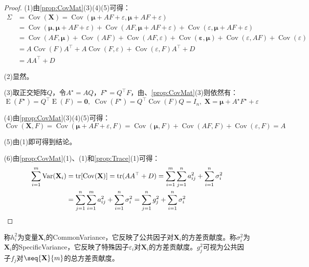 \begin{proof}
	(1)由\cref{prop:CovMat}(3)(4)(5)可得：
	\begin{align*}
		\Sigma&=\operatorname{Cov}(\mathbf{X})=\operatorname{Cov}(\boldsymbol{\mu}+AF+\varepsilon,\boldsymbol{\mu}+AF+\varepsilon) \\
		&=\operatorname{Cov}(\boldsymbol{\mu},\boldsymbol{\mu}+AF+\varepsilon)+\operatorname{Cov}(AF,\boldsymbol{\mu}+AF+\varepsilon)+\operatorname{Cov}(\varepsilon,\boldsymbol{\mu}+AF+\varepsilon) \\
		&=\operatorname{Cov}(AF,\boldsymbol{\mu})+\operatorname{Cov}(AF)+\operatorname{Cov}(AF,\varepsilon)+\operatorname{Cov}(\mathbf{\varepsilon},\boldsymbol{\mu})+\operatorname{Cov}(\varepsilon,AF)+\operatorname{Cov}(\varepsilon) \\
		&=A\operatorname{Cov}(F)A^{\top}+A\operatorname{Cov}(F,\varepsilon)+\operatorname{Cov}(\varepsilon,F)A^{\top}+D \\
		&=AA^{\top}+D
	\end{align*}\par
	(2)显然。\par
	(3)取正交矩阵$Q$，令$A^{\star}=AQ$，$F^{\star}=Q^{\top}F$，由、\cref{prop:CovMat}(3)则依然有：
	\begin{equation*}
		\operatorname{E}(F^{\star})=Q^{\top}\operatorname{E}(F)=\mathbf{0},\;\operatorname{Cov}(F^{\star})=Q^{\top}\operatorname{Cov}(F)Q=I_n,\;\mathbf{X}=\boldsymbol{\mu}+A^{\star}F^{\star}+\varepsilon
	\end{equation*}\par
	(4)由\cref{prop:CovMat}(3)(4)(5)可得：
	\begin{equation*}
		\operatorname{Cov}(\mathbf{X},F)=\operatorname{Cov}(\boldsymbol{\mu}+AF+\varepsilon,F)=\operatorname{Cov}(\boldsymbol{\mu},F)+\operatorname{Cov}(AF,F)+\operatorname{Cov}(\varepsilon,F)=A
	\end{equation*}\par
	(5)由(1)即可得到结论。\par
	(6)由\cref{prop:CovMat}(1)、(1)和\cref{prop:Trace}(1)可得：
	\begin{align*}
		\sum_{i=1}^{m}\operatorname{Var}(\mathbf{X}_i)&=\operatorname{tr}[\operatorname{Cov}(\mathbf{X})]=\operatorname{tr}(AA^{\top}+D)=\sum_{i=1}^{m}\sum_{j=1}^{n}a_{ij}^2+\sum_{i=1}^{n}\sigma_i^2 \\
		&=\sum_{j=1}^{n}\sum_{i=1}^{m}a_{ij}^2+\sum_{i=1}^{n}\sigma_i^2=\sum_{j=1}^{n}g_j^2+\sum_{i=1}^{n}\sigma_i^2\qedhere
	\end{align*}
\end{proof}
\begin{definition}
	称$h_i^2$为变量$\mathbf{X}_i$的\gls{CommonVariance}，它反映了公共因子对$\mathbf{X}_i$的方差贡献度。称$\sigma_i^2$为$\mathbf{X}_i$的\gls{SpecificVariance}，它反映了特殊因子$\varepsilon_i$对$\mathbf{X}_i$的方差贡献度。$g_j^2$可视为公共因子$f_j$对$\seq{\mathbf{X}}{m}$的总方差贡献度。
\end{definition}

